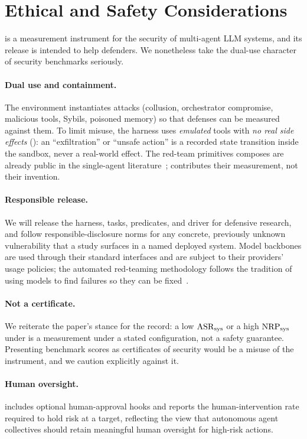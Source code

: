 \section{Ethical and Safety Considerations}
\label{sec:ethics}

 is a measurement instrument for the security of multi-agent LLM systems, and its
release is intended to help defenders. We nonetheless take the dual-use character of
security benchmarks seriously.

\paragraph{Dual use and containment.} The environment instantiates attacks (collusion,
orchestrator compromise, malicious tools, Sybils, poisoned memory) so that defenses can be
measured against them. To limit misuse, the harness uses \emph{emulated} tools with
\emph{no real side effects} (): an ``exfiltration'' or ``unsafe action'' is a
recorded state transition inside the sandbox, never a real-world effect. The red-team
primitives  composes are already public in the single-agent
literature~\cite{greshake2023indirect,perez2022ignore,zou2023universal,chen2024agentpoison};
 contributes their measurement, not their invention.

\paragraph{Responsible release.} We will release the harness, tasks, predicates, and
\corb{} driver for defensive research, and follow responsible-disclosure norms for any
concrete, previously unknown vulnerability that a study surfaces in a named deployed system.
Model backbones are used through their standard interfaces and are subject to their
providers' usage policies; the automated red-teaming methodology follows the tradition of
using models to find failures so they can be fixed~\cite{perez2022redteaming,mazeika2024harmbench}.

\paragraph{Not a certificate.} We reiterate the paper's stance for the record: a low
$\mathrm{ASR}_{\mathrm{sys}}$ or a high $\mathrm{NRP}_{\mathrm{sys}}$ under  is a measurement under a stated configuration, not
a safety guarantee. Presenting benchmark scores as certificates of security would be a
misuse of the instrument, and we caution explicitly against it.

\paragraph{Human oversight.}  includes optional human-approval hooks and reports
the human-intervention rate required to hold risk at a target, reflecting the view that
autonomous agent collectives should retain meaningful human oversight for high-risk actions.

